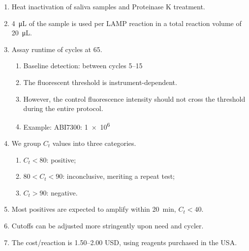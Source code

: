 \begin{enumerate}
    \item Heat inactivation of saliva samples and Proteinase K treatment.
    \item \qty{4}{\uL} of the sample is used per LAMP reaction in a total reaction volume of \qty{20}{\uL}.
    \item Assay runtime of  cycles at \qty{65}{\degC}.
    \begin{enumerate}
        \item Baseline detection: between cycles \numrange{5}{15}
        \item The fluorescent threshold is instrument-dependent.
        \item However, the control fluorescence intensity should not cross the threshold during the entire protocol.
        \item Example: ABI7300: \num[print-unity-mantissa=true]{1e6}
    \end{enumerate}
    \item We group $C_t$ values into three categories.
    \begin{enumerate}
        \item $C_t < 80$: positive;
        \item $80 < C_t < 90$: inconclusive, meriting a repeat test;
        \item $C_t > 90$: negative.
    \end{enumerate}
    \item Most positives are expected to amplify within \qty{20}{\minute}, \ie $C_t < 40$.
    \item Cutoffs can be adjusted more stringently upon need and cycler.
    \item The cost/reaction is \numrange{1.50}{2.00} USD, using reagents purchased in the USA.
\end{enumerate}